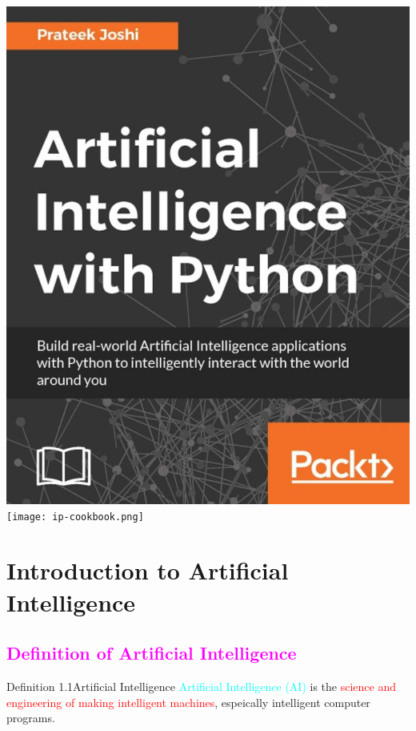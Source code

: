 \documentclass{book}
\begin{document}
\begin{center}
    \includegraphics[scale = 0.169]{artificial-intelligence-with-python.jpg}
    \texttt{[image: ip-cookbook.png]}
\end{center}

\tableofcontents
\chapter{Introduction to Artificial Intelligence}
\textcolor{magenta}{\section{\textbf{Definition of Artificial Intelligence}}}
\begin{defBox}[]{Definition 1.1}{Artificial Intelligence}
    \textcolor{cyan}{Artificial Intelligence (AI)} is the \textcolor{red}{science and engineering of making intelligent machines}, espeically intelligent computer programs.
\end{defBox}
\end{document}
